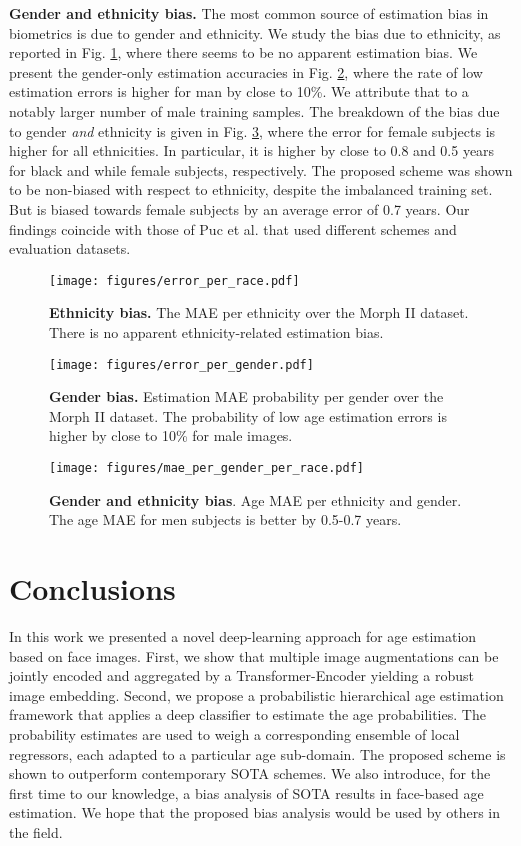 \documentclass[10pt,twocolumn,letterpaper]{article}
\begin{document}
\textbf{Gender and ethnicity bias. }The most common source of estimation
bias in biometrics is due to gender and ethnicity. We study the bias due to ethnicity, as
reported in Fig. \ref{fig:error_per_race}, where there seems to be no
apparent estimation bias. We present the gender-only estimation accuracies in Fig. \ref {fig:error_per_gender}, where the rate of low estimation errors is higher
for man by close to 10\%. We attribute that to a notably larger number of
male training samples. The breakdown of the bias due to gender \textit{and}
ethnicity is given in Fig. \ref{fig:mae_per_gender_per_race}, where the
error for female subjects is higher for all ethnicities. In particular, it
is higher by close to 0.8 and 0.5 years for black and while female subjects,
respectively. The proposed scheme was shown to be
non-biased with respect to ethnicity, despite the imbalanced training set.
But is biased towards female subjects by an average error of 0.7 years. Our
findings coincide with those of Puc et al. \cite{9287219} that used different schemes and evaluation datasets.
\begin{figure}[tbp]
\centering\texttt{[image: figures/error\_per\_race.pdf]}
\caption{\textbf{Ethnicity bias.} The MAE per ethnicity over the Morph II
dataset. There is no apparent ethnicity-related estimation bias.}
\label{fig:error_per_race}
\end{figure}
\begin{figure}[tbp]
\centering\texttt{[image: figures/error\_per\_gender.pdf]}
\caption{\textbf{Gender bias.} Estimation MAE probability per gender over
the Morph II dataset. The probability of low age estimation errors is higher
by close to 10\% for male images. }
\label{fig:error_per_gender}
\end{figure}
\begin{figure}[tbp]
\centering\texttt{[image: figures/mae\_per\_gender\_per\_race.pdf]}
\caption{\textbf{Gender and ethnicity bias}. Age MAE per ethnicity and
gender. The age MAE for men subjects is better by 0.5-0.7 years.}
\label{fig:mae_per_gender_per_race}
\end{figure}

\section{Conclusions}
In this work we presented a novel deep-learning approach for age estimation
based on face images. First, we show that multiple image augmentations can be jointly encoded and aggregated by a
Transformer-Encoder yielding a robust image embedding. Second, we propose a
probabilistic hierarchical age estimation framework that applies a deep
classifier to estimate the age probabilities. The probability estimates are
used to weigh a corresponding ensemble of local regressors, each adapted to
a particular age sub-domain. The proposed scheme is shown to outperform
contemporary SOTA schemes. We also introduce, for the first time to our
knowledge, a bias analysis of SOTA results in face-based age estimation. We hope that the proposed bias
analysis would be used by others in the field.



\end{document}

